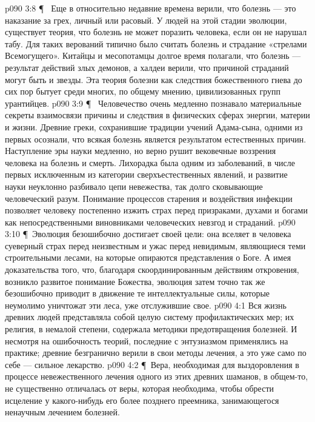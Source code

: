 \vs p090 3:8 \P\ \bibnobreakspace {} Еще в относительно недавние времена верили, что болезнь --- это наказание за грех, личный или расовый. У людей на этой стадии эволюции, существует теория, что болезнь не может поразить человека, если он не нарушал табу. Для таких верований типично было считать болезнь и страдание «стрелами Всемогущего». Китайцы и месопотамцы долгое время полагали, что болезнь --- результат действий злых демонов, а халдеи верили, что причиной страданий могут быть и звезды. Эта теория болезни как следствия божественного гнева до сих пор бытует среди многих, по общему мнению, цивилизованных групп урантийцев.
\vs p090 3:9 \P\ \bibnobreakspace {} Человечество очень медленно познавало материальные секреты взаимосвязи причины и следствия в физических сферах энергии, материи и жизни. Древние греки, сохранившие традиции учений Адама\hyp{}сына, одними из первых осознали, что всякая болезнь является результатом естественных причин. Наступление эры науки медленно, но верно рушит вековечные воззрения человека на болезнь и смерть. Лихорадка была одним из заболеваний, в числе первых исключенным из категории сверхъестественных явлений, и развитие науки неуклонно разбивало цепи невежества, так долго сковывающие человеческий разум. Понимание процессов старения и воздействия инфекции позволяет человеку постепенно изжить страх перед призраками, духами и богами как непосредственными виновниками человеческих невзгод и страданий.
\vs p090 3:10 \P\ Эволюция безошибочно достигает своей цели: она вселяет в человека суеверный страх перед неизвестным и ужас перед невидимым, являющиеся теми строительными лесами, на которые опираются представления о Боге. А имея доказательства того, что, благодаря скоординированным действиям откровения, возникло развитое понимание Божества, эволюция затем точно так же безошибочно приводит в движение те интеллектуальные силы, которые неумолимо уничтожат эти леса, уже отслужившие свое.
\vs p090 4:1 Вся жизнь древних людей представляла собой целую систему профилактических мер; их религия, в немалой степени, содержала методики предотвращения болезней. И несмотря на ошибочность теорий, последние с энтузиазмом применялись на практике; древние безгранично верили в свои методы лечения, а это уже само по себе --- сильное лекарство.
\vs p090 4:2 \P\ Вера, необходимая для выздоровления в процессе невежественного лечения одного из этих древних шаманов, в общем\hyp{}то, не существенно отличалась от веры, которая необходима, чтобы обрести исцеление у какого\hyp{}нибудь его более позднего преемника, занимающегося ненаучным лечением болезней.
